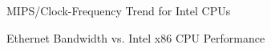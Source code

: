 \begin{figure}[tbp]
\centering
{}
\caption{MIPS/Clock-Frequency Trend for Intel CPUs}
\label{fig:SMPdesign:Clock-Frequency Trend for Intel CPUs}
\end{figure}

\begin{figure}[tbp]
\centering
{}
\caption{Ethernet Bandwidth vs. Intel x86 CPU Performance}
\label{fig:SMPdesign:Ethernet Bandwidth vs. Intel x86 CPU Performance}
\end{figure}

